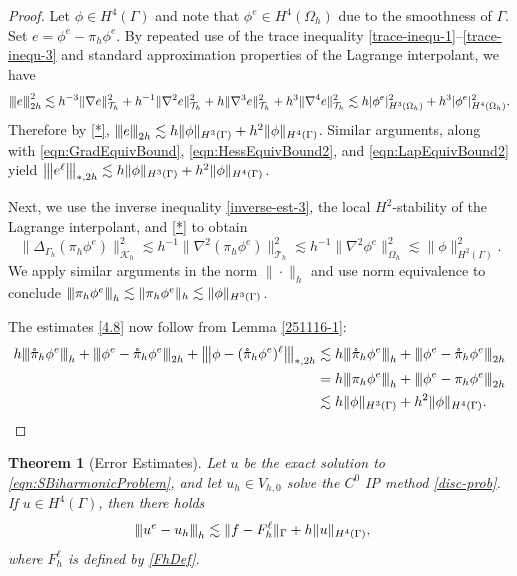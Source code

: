 \documentclass[10pt, a4paper]{amsart}
\newcommand{\nab}{\nabla}
\newcommand{\calT}{\mathcal{T}}
\newcommand{\calK}{\mathcal{K}}
\newtheorem{theorem}{Theorem}[section]
\theoremstyle{definition}
\theoremstyle{remark}
\theoremstyle{example}
\numberwithin{equation}{section}
\newcommand{\tbar}[1]{{\left\vert\kern-0.25ex\left\vert\kern-0.25ex\left\vert #1 
    \right\vert\kern-0.25ex\right\vert\kern-0.25ex\right\vert}}
\begin{document}
\begin{proof}

Let $\phi\in H^4(\Gamma)$ and note that $\phi^e\in H^4(\Omega_h)$ due to
the smoothness of $\Gamma$. 
Set $e = \phi^e - {\pi}_h \phi^e$.
By repeated use of the trace inequality \eqref{trace-inequ-1}--\eqref{trace-inequ-3} and standard approximation properties of the Lagrange interpolant, we have
%
\begin{align*}
\tbar{e}^2_{2h}\lesssim h^{-3}\|\nab e\|_{\calT_h}^2 + h^{-1} \|\nab^2 e\|_{\calT_h}^2 + h \|\nab^3 e\|_{\calT_h}^2 +h^3 \|\nab^4 e\|_{\calT_h}^2 \lesssim h |\phi^e|_{H^3(\Omega_h)}^2+h^3 |\phi^e|_{H^4(\Omega_h)}^2.
\end{align*}
Therefore by \eqref{*}, $\tbar{e}_{2h}\lesssim h \|\phi\|_{H^3(\Gamma)}+h^2 \|\phi\|_{H^4(\Gamma)}$.  Similar arguments,
along with \eqref{eqn:GradEquivBound}, \eqref{eqn:HessEquivBound2}, and \eqref{eqn:LapEquivBound2} yield
$\tbar{e^\ell}_{*, 2h} \lesssim h \|\phi\|_{H^3(\Gamma)}+h^2 \|\phi\|_{H^4(\Gamma)}$.


Next, we use the inverse inequality \eqref{inverse-est-3}, the local $H^2$-stability of the Lagrange interpolant, and \eqref{*} to obtain
\[
\|\Delta_{\Gamma_h} ({\pi}_h \phi^e)\|_{\calK_h}^2
%
\lesssim h^{-1}\|\nab^2 ({\pi}_h \phi^e)\|_{\calT_h}^2\lesssim h^{-1} \|\nab^2 \phi^e\|_{\Omega_h}^2\lesssim \|\phi\|_{H^2(\Gamma)}^2.
\]
We apply similar arguments in the norm $\|\cdot\|_h$ 
and use norm equivalence to conclude $\tbar{\pi_h \phi^e}_h\lesssim 
\|\pi_h \phi^e \|_h\lesssim \|\phi\|_{H^3(\Gamma)}$.


The estimates \eqref{4.8} now
follow from Lemma \ref{251116-1}:
\begin{align*}
h\tbar{\mathring{\pi}_h \phi^e}_h + \tbar{\phi^e-\mathring{\pi}_h \phi^e}_{2h}+\tbar{\phi-(\mathring{\pi}_h \phi^e)^\ell}_{*,2h}
&\lesssim h\tbar{\mathring{\pi}_h \phi^e}_h + \tbar{\phi^e-\mathring{\pi}_h \phi^e}_{2h}\\
&= h\tbar{{\pi}_h \phi^e}_h + \tbar{\phi^e-{\pi}_h \phi^e}_{2h}\\
&\lesssim h \|\phi\|_{H^3(\Gamma)}+h^2 \|\phi\|_{H^4(\Gamma)}.
\end{align*}
\end{proof}

\begin{theorem}[Error Estimates] \label{H2ErrorThm}
Let $u$ be the exact solution to \eqref{eqn:SBiharmonicProblem}, 
and let $u_h \in V_{h, 0}$ solve the $C^0$ IP method \eqref{disc-prob}. If $u \in H^4(\Gamma)$, then there holds
\begin{align}
\tbar{u^e - u_h}_h
& \lesssim \|f - F_h^\ell\|_{\Gamma} +h\|u\|_{H^4(\Gamma)}, \label{251019-2}
\end{align}
where $F_h^\ell$ is defined by \eqref{FhDef}.
\end{theorem}
\end{document}
